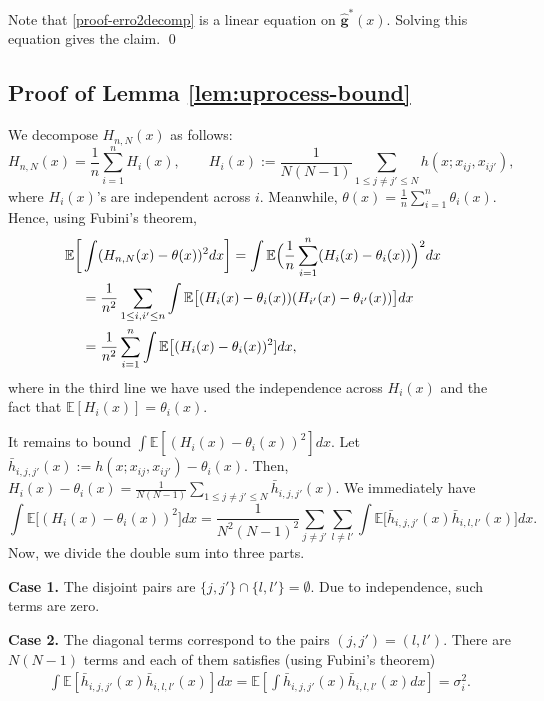 \documentclass[preprint,11pt]{article}
\newcommand{\mbb}{\mathbb}
\newcommand{\bg}{{\boldsymbol g}}
\numberwithin{equation}{section}
\newcommand{\beq}{\begin{equation}}
\newcommand{\eeq}{\end{equation}}
\begin{document}
Note that \eqref{proof-erro2decomp} is a linear equation on $\widehat{\bg}^*(x)$. 
Solving this equation gives the claim. \qed

\subsection{Proof of Lemma \ref{lem:uprocess-bound}}\label{sec:pf-lem:uprocess-bound}
We decompose $H_{n,N}(x)$ as follows: 
\[
 H_{n,N}(x)=\frac{1}{n}\sum_{i=1}^n H_i(x), \qquad        H_i(x):=\frac{1}{N(N-1)}\sum_{1\le j\neq j'\le N}h(x;x_{ij},x_{ij'}), 
\]
where $H_i(x)$'s are independent across $i$. 
Meanwhile, $\theta(x)=\frac{1}{n}\sum_{i=1}^n \theta_i(x)$. 
Hence, using Fubini's theorem,
    \begin{align} \label{proof-intvarU-1}
\mbb{E}\biggl[&\int (H_{n,N}(x)-\theta(x))^2dx\biggr]=\int \mbb{E}\Bigl(\frac{1}{n}\sum_{i=1}^{n}(H_i(x)-\theta_i(x))\Bigr)^2dx\cr
&= \frac{1}{n^2}\sum_{1\leq i, i'\leq n}\int \mathbb{E}\bigl[(H_i(x)-\theta_i(x))(H_{i'}(x)-\theta_{i'}(x))\bigr]dx\cr
&= \frac{1}{n^2}\sum_{i=1}^n\int \mathbb{E}\bigl[ (H_i(x)-\theta_i(x))^2]dx,  
    \end{align}
where %
in the third line we have used the independence across $H_i(x)$ and the fact that $\mathbb{E}[H_i(x)]=\theta_i(x)$.

It remains to bound $\int\mathbb{E}[(H_i(x)-\theta_i(x))^2]dx$. 
Let $\bar{h}_{i,j,j'}(x):=h(x;x_{ij},x_{ij'})-\theta_i(x)$. Then, $H_i(x)-\theta_i(x)=\frac{1}{N(N-1)}\sum_{1\le j\neq j'\le N}\bar{h}_{i,j,j'}(x)$. 
We immediately have
\beq  \label{proof-intvarU-2}
  \int \mathbb{E}\bigl[ (H_i(x)-\theta_i(x))^2]dx =\frac{1}{N^2(N-1)^2}\sum_{j\neq j'}\sum_{l\neq l'}\int \mbb{E}\bigl[\bar{h}_{i,j,j'}(x)\bar{h}_{i,l,l'}(x)\bigr]dx.
\eeq
    Now, we divide the double sum into three parts.

    \textbf{Case 1.} The disjoint pairs are $\{j,j'\}\cap\{l,l'\}=\emptyset$. Due to independence, such terms are zero.
    
    \textbf{Case 2.} The diagonal terms correspond to the pairs $(j,j')=(l,l')$. There are $N(N-1)$ terms and each of them satisfies (using Fubini's theorem)
    \begin{align*}
        \int \mbb{E}[\bar{h}_{i,j,j'}(x)\bar{h}_{i,l,l'}(x)]dx=\mbb{E}\left[\int \bar{h}_{i,j,j'}(x)\bar{h}_{i,l,l'}(x)dx\right]=\sigma_i^2.
    \end{align*}
    
\end{document}
